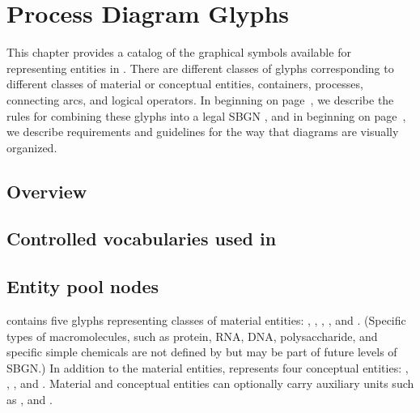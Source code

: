 
\chapter{Process Diagram Glyphs}


This chapter provides a catalog of the graphical symbols available for representing entities in \PDs.  There are different classes of glyphs corresponding to different classes of material or conceptual entities, containers, processes, connecting arcs, and logical operators.  In  beginning on page~\pageref{chp:grammar}, we describe the rules for combining these glyphs into a legal SBGN \PD, and in  beginning on page~\pageref{chp:layout}, we describe requirements and guidelines for the way that diagrams are visually organized.

\section{Overview}



\section{Controlled vocabularies used in \SBGNPDLone}\label{sec:CVs}




\section{Entity pool nodes}\label{sec:EPNs}

\SBGNPDLone{} contains five glyphs representing classes of material entities: , , , , and .  (Specific types of macromolecules, such as protein, RNA, DNA, polysaccharide, and specific simple chemicals are not defined by \SBGNPDLone but may be part of future levels of SBGN.)  In addition to the material entities, \SBGNPDLone{} represents four conceptual entities: , , , and .  Material and conceptual entities can optionally carry auxiliary units such as ,  and .

